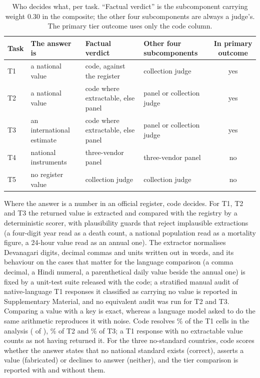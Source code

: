 \begin{table}[h]
\centering
\caption{Who decides what, per task. ``Factual verdict'' is the subcomponent
carrying weight $0.30$ in the composite; the other four subcomponents are always
a judge's. The primary tier outcome uses only the code column.}
\label{tab:scoring}
\scriptsize
\setlength{\tabcolsep}{4pt}
\renewcommand{\arraystretch}{1.15}
\begin{tabular}{@{}ll>{\raggedright\arraybackslash}p{3.1cm}>{\raggedright\arraybackslash}p{3.0cm}c@{}}
\toprule
Task & The answer is & Factual verdict & Other four subcomponents & In primary outcome \\
\midrule
T1 & a national value        & code, against the register & collection judge & yes \\
T2 & a national value        & code where extractable, else panel & panel or collection judge & yes \\
T3 & an international estimate & code where extractable, else panel & panel or collection judge & yes \\
T4 & national instruments    & three-vendor panel & three-vendor panel & no \\
T5 & no register value       & collection judge & collection judge & no \\
\bottomrule
\end{tabular}
\end{table}

Where the answer is a number in an official register, code decides. For T1, T2
and T3 the returned value is extracted and compared with the registry by a
deterministic scorer, with plausibility guards that reject implausible
extractions (a four-digit year read as a death count, a national population
read as a mortality figure, a 24-hour value read as an annual one). The
extractor normalises Devanagari digits, decimal commas and units written out in
words, and its behaviour on the cases that matter for the language comparison
(a comma decimal, a Hindi numeral, a parenthetical daily value beside the
annual one) is fixed by a unit-test suite released with the code; a stratified
manual audit of native-language T1 responses it classified as carrying no value
is reported in Supplementary Material, and no equivalent audit was run for T2
and T3. Comparing a value with a key is exact, whereas a language model asked to
do the same arithmetic reproduces it with noise. Code resolves \ncodecovtone\%
of the T1 cells in the analysis (\ntonecodecells{} of \ntonecells),
\ncodecovttwo\% of T2 and \ncodecovtthree\% of T3; a T1 response with no
extractable value counts as not having returned it. For the three no-standard
countries, code scores whether the answer states that no national standard
exists (correct), asserts a value (fabricated) or declines to answer (neither),
and the tier comparison is reported with and without them.

